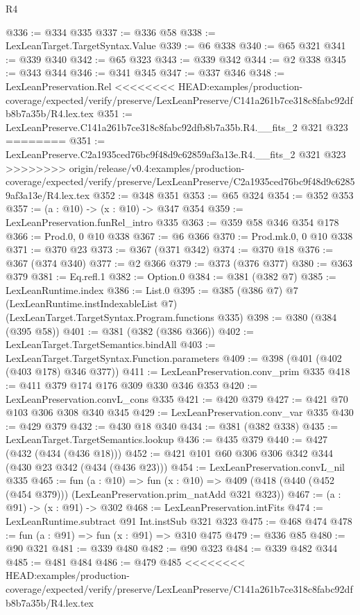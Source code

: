 \begin{lexlean}{R4}
\begin{coremodule}
{{{{{{{{{{{{{{{{{{{{@336 := @334 @335
@337 := @336 @58
@338 := LexLeanTarget.TargetSyntax.Value
@339 := @6 @338
@340 := @65 @321
@341 := @339 @340
@342 := @65 @323
@343 := @339 @342
@344 := @2 @338
@345 := @343 @344
@346 := @341 @345
@347 := @337 @346
@348 := LexLeanPreservation.Rel
<<<<<<<< HEAD:examples/production-coverage/expected/verify/preserve/LexLeanPreserve/C141a261b7ce318c8fabc92dfb8b7a35b/R4.lex.tex
@351 := LexLeanPreserve.C141a261b7ce318c8fabc92dfb8b7a35b.R4.__fits_2 @321 @323
========
@351 := LexLeanPreserve.C2a1935ced76bc9f48d9c62859af3a13e.R4.__fits_2 @321 @323
>>>>>>>> origin/release/v0.4:examples/production-coverage/expected/verify/preserve/LexLeanPreserve/C2a1935ced76bc9f48d9c62859af3a13e/R4.lex.tex
@352 := @348 @351
@353 := @65 @324
@354 := @352 @353
@357 := (a : @10) -> (x : @10) -> @347 @354
@359 := LexLeanPreservation.funRel_intro @335
@363 := @359 @58 @346 @354 @178
@366 := Prod.{0, 0} @10 @338
@367 := @6 @366
@370 := Prod.mk.{0, 0} @10 @338
@371 := @370 @23
@373 := @367 (@371 @342)
@374 := @370 @18
@376 := @367 (@374 @340)
@377 := @2 @366
@379 := @373 (@376 @377)
@380 := @363 @379
@381 := Eq.refl.{1}
@382 := Option.{0}
@384 := @381 (@382 @7)
@385 := LexLeanRuntime.index
@386 := List.{0}
@395 := @385
    (@386 @7)
    @7
    (LexLeanRuntime.instIndexableList @7)
    (LexLeanTarget.TargetSyntax.Program.functions @335)
@398 := @380 (@384 (@395 @58))
@401 := @381 (@382 (@386 @366))
@402 := LexLeanTarget.TargetSemantics.bindAll
@403 := LexLeanTarget.TargetSyntax.Function.parameters
@409 := @398 (@401 (@402 (@403 @178) @346 @377))
@411 := LexLeanPreservation.conv_prim @335
@418 := @411 @379 @174 @176 @309 @330 @346 @353
@420 := LexLeanPreservation.convL_cons @335
@421 := @420 @379
@427 := @421 @70 @103 @306 @308 @340 @345
@429 := LexLeanPreservation.conv_var @335
@430 := @429 @379
@432 := @430 @18 @340
@434 := @381 (@382 @338)
@435 := LexLeanTarget.TargetSemantics.lookup
@436 := @435 @379
@440 := @427 (@432 (@434 (@436 @18)))
@452 := @421 @101 @60 @306 @306 @342 @344 (@430 @23 @342 (@434 (@436 @23)))
@454 := LexLeanPreservation.convL_nil @335
@465 := fun (a : @10) =>
  fun (x : @10) => @409 (@418 (@440 (@452 (@454 @379))) (LexLeanPreservation.prim_natAdd @321 @323))
@467 := (a : @91) -> (x : @91) -> @302
@468 := LexLeanPreservation.intFits
@474 := LexLeanRuntime.subtract @91 Int.instSub @321 @323
@475 := @468 @474
@478 := fun (a : @91) => fun (x : @91) => @310 @475
@479 := @336 @85
@480 := @90 @321
@481 := @339 @480
@482 := @90 @323
@484 := @339 @482 @344
@485 := @481 @484
@486 := @479 @485
<<<<<<<< HEAD:examples/production-coverage/expected/verify/preserve/LexLeanPreserve/C141a261b7ce318c8fabc92dfb8b7a35b/R4.lex.tex
}}}}}}}}}}}}}}}}}}}}
\end{coremodule}
\end{lexlean}
